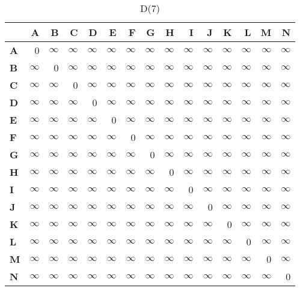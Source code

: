 \documentclass{article}
\newcommand{\INF}{$\infty$}
\begin{document}
\begin{table}[H]\centering
\caption{D(7)}
\begin{tabular}{l r r r r r r r r r r r r r r}
\toprule
 & \textbf{A} & \textbf{B} & \textbf{C} & \textbf{D} & \textbf{E} & \textbf{F} & \textbf{G} & \textbf{H} & \textbf{I} & \textbf{J} & \textbf{K} & \textbf{L} & \textbf{M} & \textbf{N}\\\midrule
\textbf{A} & 0 & \INF & \INF & \INF & \INF & \INF & \INF & \INF & \INF & \INF & \INF & \INF & \INF & \INF \\
\textbf{B} & \INF & 0 & \INF & \INF & \INF & \INF & \INF & \INF & \INF & \INF & \INF & \INF & \INF & \INF \\
\textbf{C} & \INF & \INF & 0 & \INF & \INF & \INF & \INF & \INF & \INF & \INF & \INF & \INF & \INF & \INF \\
\textbf{D} & \INF & \INF & \INF & 0 & \INF & \INF & \INF & \INF & \INF & \INF & \INF & \INF & \INF & \INF \\
\textbf{E} & \INF & \INF & \INF & \INF & 0 & \INF & \INF & \INF & \INF & \INF & \INF & \INF & \INF & \INF \\
\textbf{F} & \INF & \INF & \INF & \INF & \INF & 0 & \INF & \INF & \INF & \INF & \INF & \INF & \INF & \INF \\
\textbf{G} & \INF & \INF & \INF & \INF & \INF & \INF & 0 & \INF & \INF & \INF & \INF & \INF & \INF & \INF \\
\textbf{H} & \INF & \INF & \INF & \INF & \INF & \INF & \INF & 0 & \INF & \INF & \INF & \INF & \INF & \INF \\
\textbf{I} & \INF & \INF & \INF & \INF & \INF & \INF & \INF & \INF & 0 & \INF & \INF & \INF & \INF & \INF \\
\textbf{J} & \INF & \INF & \INF & \INF & \INF & \INF & \INF & \INF & \INF & 0 & \INF & \INF & \INF & \INF \\
\textbf{K} & \INF & \INF & \INF & \INF & \INF & \INF & \INF & \INF & \INF & \INF & 0 & \INF & \INF & \INF \\
\textbf{L} & \INF & \INF & \INF & \INF & \INF & \INF & \INF & \INF & \INF & \INF & \INF & 0 & \INF & \INF \\
\textbf{M} & \INF & \INF & \INF & \INF & \INF & \INF & \INF & \INF & \INF & \INF & \INF & \INF & 0 & \INF \\
\textbf{N} & \INF & \INF & \INF & \INF & \INF & \INF & \INF & \INF & \INF & \INF & \INF & \INF & \INF & 0 \\
\bottomrule
\end{tabular}
\end{table}
\end{document}
